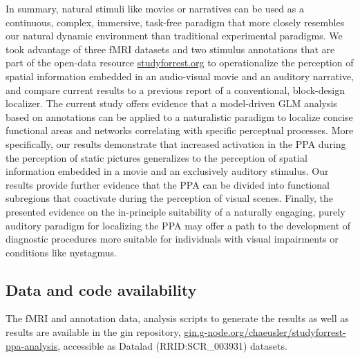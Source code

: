 \documentclass[english]{article}
\begin{document}
In summary, natural stimuli like movies \citep{eickhoff2020towards,
hasson2008neurocinematics, sonkusare2019naturalistic} or narratives
\citep{hamilton2018revolution, honey2012not, lerner2011topographic,
silbert2014coupled, wilson2008beyond} can be used as a continuous, complex,
immersive, task-free paradigm that more closely resembles our natural dynamic
environment than traditional experimental paradigms.
We took advantage of three fMRI datasets and two stimulus annotations that are
part of the open-data resource
\href{http://www.studyforrest.org}{studyforrest.org} to operationalize the
perception of spatial information embedded in an audio-visual movie and an
auditory narrative, and compare current results to a previous report of a
conventional, block-design localizer.
The current study offers evidence that a model-driven GLM analysis based on
annotations can be applied to a naturalistic paradigm to localize concise
functional areas and networks correlating with specific perceptual processes.
More specifically, our results demonstrate that increased activation in the PPA
during the perception of static pictures generalizes to the perception of
spatial information embedded in a movie and an exclusively auditory stimulus.
Our results provide further evidence that the PPA can be divided into
functional subregions that coactivate during the perception of visual scenes.
Finally, the presented evidence on the in-principle suitability of a naturally
engaging, purely auditory paradigm for localizing the PPA may offer a path to
the development of diagnostic procedures more suitable for individuals with
visual impairments or conditions like nystagmus.



\subsection*{Data and code availability}

The fMRI and annotation data, analysis scripts to generate the results as well
as results are available in the gin repository,
\href{https://gin.g-node.org/chaeusler/studyforrest-ppa-analysis}{gin.g-node.org/chaeusler/studyforrest-ppa-analysis}, accessible as Datalad (RRID:SCR\_003931) datasets.
\end{document}
